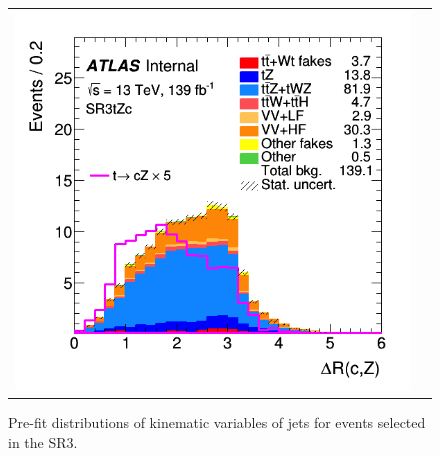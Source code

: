 \begin{figure}[]
\begin{tabular}{cc}
		\includegraphics[width=.35\textwidth]{Appendices/AP5/figures/SR3_UsingDL1rc/qZ_dR} \\
	\end{tabular}
	\caption{Pre-fit distributions of kinematic variables of jets for events selected in the SR3\tZc.
		\ErrStatOnly
		\Blinded
	}%
	\label{fig:sel:sr3:jets}
\end{figure}

\clearpage
\FloatBarrier

